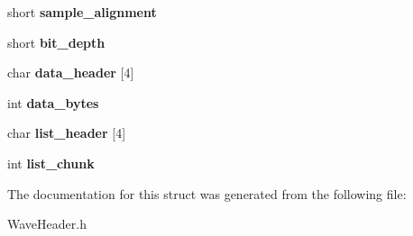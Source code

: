 \begin{DoxyCompactItemize}
short {\bfseries sample\+\_\+alignment}
\item 
\mbox{\label{structwav__header_a63fa60069060bae97c8a64c5b37afa23}} 
short {\bfseries bit\+\_\+depth}
\item 
\mbox{\label{structwav__header_ae43fac12459053e98a80e3879c5cd2a7}} 
char {\bfseries data\+\_\+header} \mbox{[}4\mbox{]}
\item 
\mbox{\label{structwav__header_a3eeeca270947eab7c7aaee61bbee9b0e}} 
int {\bfseries data\+\_\+bytes}
\item 
\mbox{\label{structwav__header_a6bf96a06d52733e2ac54abcbf6ab05a5}} 
char {\bfseries list\+\_\+header} \mbox{[}4\mbox{]}
\item 
\mbox{\label{structwav__header_aa7ecbffb303ffc816068b00fac3daf5e}} 
int {\bfseries list\+\_\+chunk}
\end{DoxyCompactItemize}


The documentation for this struct was generated from the following file\+:\begin{DoxyCompactItemize}
\item 
Wave\+Header.\+h\end{DoxyCompactItemize}
